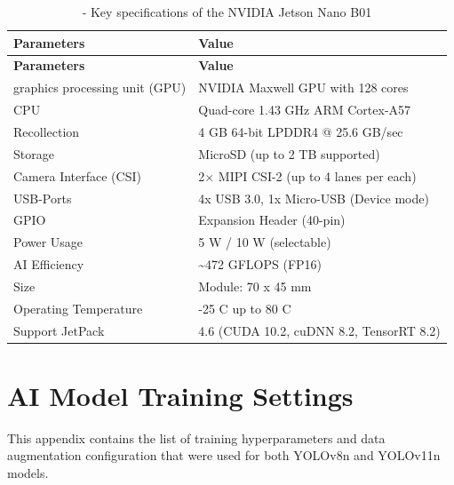 \documentclass[12pt,a4paper]{report}
\renewcommand{\arraystretch}{1.25}
\begin{document}
\begingroup
\small
\setlength{\parskip}{0pt}
\setlength{\tabcolsep}{4pt}
\renewcommand{\arraystretch}{1.2}
\begin{longtable}{|P{0.35\textwidth}|P{0.55\textwidth}|}
\caption{- Key specifications of the NVIDIA Jetson Nano B01}\\
\hline
\textbf{Parameters} & \textbf{Value} \\ \hline
\endfirsthead
\hline
\textbf{Parameters} & \textbf{Value} \\ \hline
\endhead
graphics processing unit (GPU) & NVIDIA Maxwell GPU with 128 cores \\ \hline
CPU & Quad-core 1.43 GHz ARM Cortex-A57 \\ \hline
Recollection & 4 GB 64-bit LPDDR4 @ 25.6 GB/sec \\ \hline
Storage & MicroSD (up to 2 TB supported) \\ \hline
Camera Interface (CSI) & 2$\times$ MIPI CSI-2 (up to 4 lanes per each) \\ \hline
USB-Ports & 4x USB 3.0, 1x Micro-USB (Device mode) \\ \hline
GPIO & Expansion Header (40-pin) \\ \hline
Power Usage & 5 W / 10 W (selectable) \\ \hline
AI Efficiency & \textasciitilde{}472 GFLOPS (FP16) \\ \hline
Size & Module: 70 x 45 mm \\ \hline
Operating Temperature & -25 \textdegree{}C up to 80 \textdegree{}C \\ \hline
Support JetPack & 4.6 (CUDA 10.2, cuDNN 8.2, TensorRT 8.2) \\ \hline
\end{longtable}
\endgroup

\chapter{AI Model Training Settings}
\pagestyle{fancy}
\thispagestyle{empty}

This appendix contains the list of training hyperparameters and data augmentation configuration that were used for both YOLOv8n and YOLOv11n models.
\end{document}
